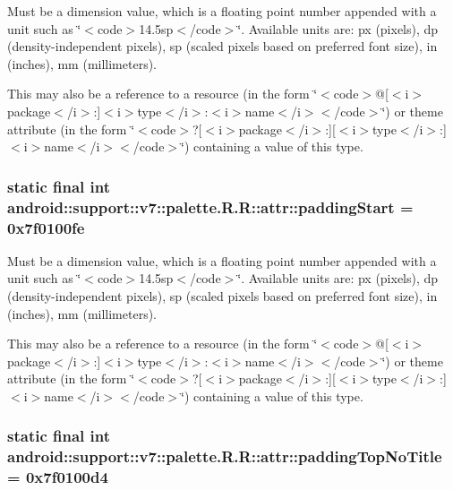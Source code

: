 Must be a dimension value, which is a floating point number appended with a unit such as \char`\"{}$<$code$>$14.5sp$<$/code$>$\char`\"{}. Available units are: px (pixels), dp (density-independent pixels), sp (scaled pixels based on preferred font size), in (inches), mm (millimeters). 

This may also be a reference to a resource (in the form \char`\"{}$<$code$>$@\mbox{[}$<$i$>$package$<$/i$>$:\mbox{]}$<$i$>$type$<$/i$>$:$<$i$>$name$<$/i$>$$<$/code$>$\char`\"{}) or theme attribute (in the form \char`\"{}$<$code$>$?\mbox{[}$<$i$>$package$<$/i$>$:\mbox{]}\mbox{[}$<$i$>$type$<$/i$>$:\mbox{]}$<$i$>$name$<$/i$>$$<$/code$>$\char`\"{}) containing a value of this type. \hypertarget{classandroid_1_1support_1_1v7_1_1palette_1_1_r_1_1attr_523fa8a4f548e177bff7159d5e68fca6}{
\subsubsection[{paddingStart}]{\setlength{\rightskip}{0pt plus 5cm}static final int android::support::v7::palette.R.R::attr::paddingStart = 0x7f0100fe}}
\label{classandroid_1_1support_1_1v7_1_1palette_1_1_r_1_1attr_523fa8a4f548e177bff7159d5e68fca6}


Must be a dimension value, which is a floating point number appended with a unit such as \char`\"{}$<$code$>$14.5sp$<$/code$>$\char`\"{}. Available units are: px (pixels), dp (density-independent pixels), sp (scaled pixels based on preferred font size), in (inches), mm (millimeters). 

This may also be a reference to a resource (in the form \char`\"{}$<$code$>$@\mbox{[}$<$i$>$package$<$/i$>$:\mbox{]}$<$i$>$type$<$/i$>$:$<$i$>$name$<$/i$>$$<$/code$>$\char`\"{}) or theme attribute (in the form \char`\"{}$<$code$>$?\mbox{[}$<$i$>$package$<$/i$>$:\mbox{]}\mbox{[}$<$i$>$type$<$/i$>$:\mbox{]}$<$i$>$name$<$/i$>$$<$/code$>$\char`\"{}) containing a value of this type. \hypertarget{classandroid_1_1support_1_1v7_1_1palette_1_1_r_1_1attr_d7f5e9bb2d17e97b488e5b421110cfa5}{
\subsubsection[{paddingTopNoTitle}]{\setlength{\rightskip}{0pt plus 5cm}static final int android::support::v7::palette.R.R::attr::paddingTopNoTitle = 0x7f0100d4}}
\label{classandroid_1_1support_1_1v7_1_1palette_1_1_r_1_1attr_d7f5e9bb2d17e97b488e5b421110cfa5}


